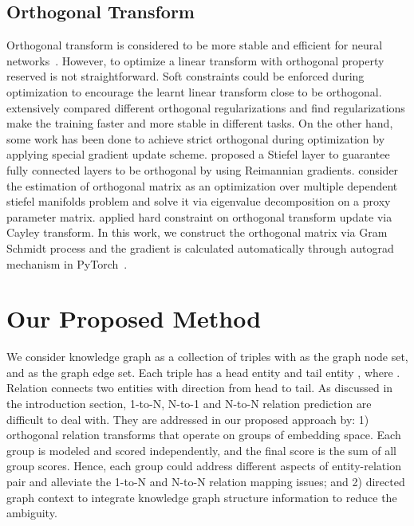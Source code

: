 \documentclass[11pt,a4paper]{article}
\begin{document}
\subsection{Orthogonal Transform}
Orthogonal transform is considered to be more stable and efficient for neural networks~\cite{Saxe2013ExactST,Vorontsov2017OnOA}. 
However, to optimize a linear transform with orthogonal property reserved is not straightforward.  Soft constraints could be enforced during optimization to encourage the learnt linear transform close to be orthogonal. \citet{Bansal2018CanWG} extensively compared different orthogonal regularizations and find regularizations make the training faster and more stable in different tasks. On the other hand, some work has been done to achieve strict orthogonal during optimization by applying special gradient update scheme. \citet{Harandi2016GeneralizedB} proposed a Stiefel layer to guarantee fully connected layers to be orthogonal by using Reimannian gradients. \citet{Huang2017OrthogonalWN} consider the estimation of orthogonal matrix as an optimization over multiple dependent stiefel manifolds problem and  solve it via eigenvalue decomposition on a proxy parameter matrix.
\citet{Vorontsov2017OnOA} applied hard constraint on orthogonal transform update via Cayley transform. In this work, we construct the orthogonal matrix via Gram Schmidt process and the gradient is calculated automatically through autograd mechanism in PyTorch~\cite{paszke2017automatic}.







\section{Our Proposed Method}

We consider knowledge graph as a collection of triples  with  as the graph node set, and  as the graph edge set. Each triple has a head entity  and tail entity , where . Relation  connects two entities with direction from head to tail.
As discussed in the introduction section, 1-to-N, N-to-1 and N-to-N relation prediction \cite{bordes2013translating,wang2014knowledge} are difficult to deal with. They are addressed in our proposed approach by: 1) orthogonal relation transforms that operate on groups of embedding space. Each group is modeled and scored independently, and the final score is the sum of all group scores. Hence, each group could address different aspects of entity-relation pair and alleviate the 1-to-N and N-to-N relation mapping issues; and 2) directed graph context to integrate knowledge graph structure information to reduce the ambiguity. 
\end{document}
